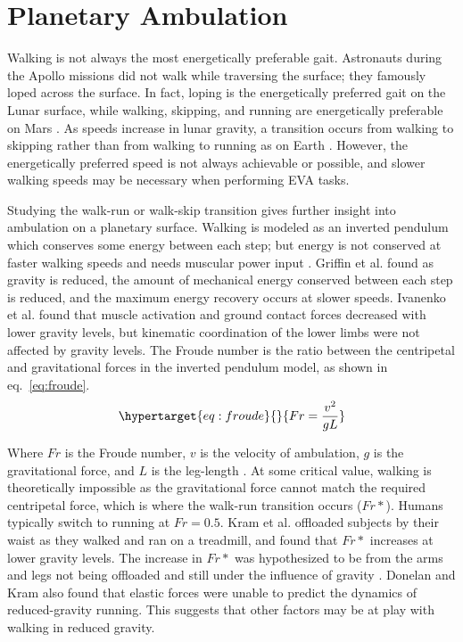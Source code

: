 \documentclass[defaultstyle,11pt]{comps}
\begin{document}
\hypertarget{planetary-ambulation}{%
\section{Planetary Ambulation}\label{planetary-ambulation}}

Walking is not always the most energetically preferable gait.
Astronauts during the Apollo missions did not walk while traversing the surface; they famously loped across the surface.
In fact, loping is the energetically preferred gait on the Lunar surface, while walking, skipping, and running are energetically preferable on Mars \citep{Ackermann2012b}.
As speeds increase in lunar gravity, a transition occurs from walking to skipping rather than from walking to running as on Earth \citep{Minetti2012}.
However, the energetically preferred speed is not always achievable or possible, and slower walking speeds may be necessary when performing EVA tasks.

Studying the walk-run or walk-skip transition gives further insight into ambulation on a planetary surface.
Walking is modeled as an inverted pendulum which conserves some energy between each step; but energy is not conserved at faster walking speeds and needs muscular power input \citep{Cavagna1976, Cavagna1977}.
Griffin et al. \citep{Griffin1999} found as gravity is reduced, the amount of mechanical energy conserved between each step is reduced, and the maximum energy recovery occurs at slower speeds.
Ivanenko et al. \citep{Ivanenko2002} found that muscle activation and ground contact forces decreased with lower gravity levels, but kinematic coordination of the lower limbs were not affected by gravity levels.
The Froude number is the ratio between the centripetal and gravitational forces in the inverted pendulum model, as shown in eq.~\ref{eq:froude}.
\begin{equation}\protect\hypertarget{eq:froude}{}{
Fr=\frac{v^{2}}{gL}
}\label{eq:froude}\end{equation}

Where \(Fr\) is the Froude number, \(v\) is the velocity of ambulation, \(g\) is the gravitational force, and \(L\) is the leg-length \citep{AlexanderMcN.1989}.
At some critical value, walking is theoretically impossible as the gravitational force cannot match the required centripetal force, which is where the walk-run transition occurs (\(Fr*\)).
Humans typically switch to running at \(Fr=0.5\).
Kram et al. \citep{Kram1997} offloaded subjects by their waist as they walked and ran on a treadmill, and found that \(Fr*\) increases at lower gravity levels.
The increase in \(Fr*\) was hypothesized to be from the arms and legs not being offloaded and still under the influence of gravity \citep{Kram1997}.
Donelan and Kram \citep{Donelan2000} also found that elastic forces were unable to predict the dynamics of reduced-gravity running.
This suggests that other factors may be at play with walking in reduced gravity.
\end{document}
